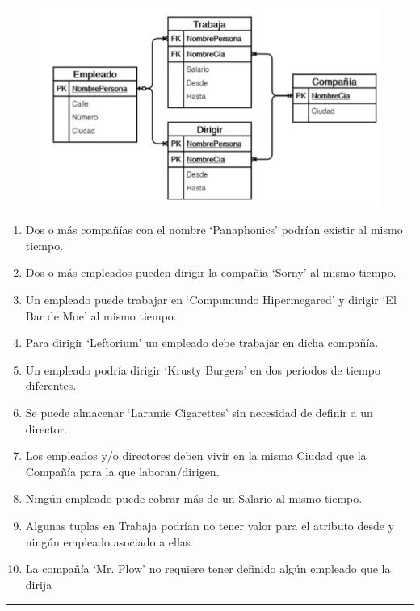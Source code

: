 \documentclass{exam}
\begin{document}
\begin{questions}
	\begin{figure}[h!]
		\includegraphics[width=15cm]{pregunta_4.png}
		\centering
	\end{figure}
	
	\begin{enumerate}[label=\alph*.]
		\item Dos o más compañías con el nombre ‘Panaphonics’ podrían
existir al mismo tiempo.
		\item Dos o más empleados pueden dirigir la compañía ‘Sorny’ al mismo tiempo.
		\item Un empleado puede trabajar en ‘Compumundo Hipermegared’ y dirigir ‘El Bar de Moe’ al mismo tiempo.
		\item Para dirigir ‘Leftorium’ un empleado debe trabajar en dicha compañía.
		\item Un empleado podría dirigir ‘Krusty Burgers’ en dos períodos de tiempo diferentes.
		\item Se puede almacenar ‘Laramie Cigarettes’ sin necesidad de definir a un director.
		\item Los empleados y/o directores deben vivir en la misma Ciudad que la Compañía para la que laboran/dirigen.
		\item Ningún empleado puede cobrar más de un Salario al mismo tiempo.
		\item Algunas tuplas en Trabaja podrían no tener valor para el atributo desde y ningún empleado asociado a ellas.
		\item La compañía ‘Mr. Plow’ no requiere tener definido algún empleado que la dirija
	\end{enumerate}
	
\end{questions}

\noindent
\rule[2ex]{\textwidth}{2pt}
\end{document}
